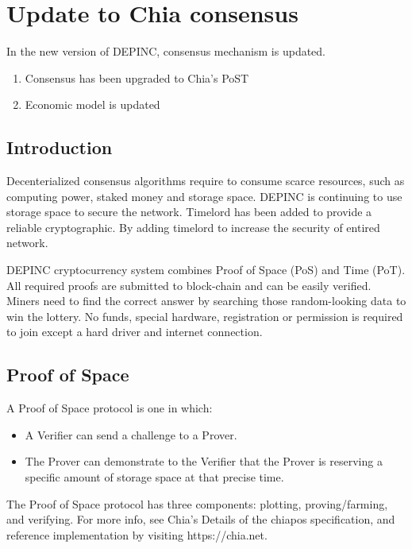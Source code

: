 \chapter{Update to Chia consensus}
\begin{flushleft}
    In the new version of DEPINC, consensus mechanism is updated.
    \begin{enumerate}
        \item Consensus has been upgraded to Chia's PoST
        \item Economic model is updated
    \end{enumerate}
\end{flushleft}
\section{Introduction}
\begin{flushleft}
    Decenterialized consensus algorithms require to consume scarce resources, such as computing power, staked money and storage space. DEPINC is continuing to use storage space to secure the network. Timelord has been added to provide a reliable cryptographic. By adding timelord to increase the security of entired network.
\end{flushleft}
\begin{flushleft}
    DEPINC cryptocurrency system combines Proof of Space (PoS) and Time (PoT). All required proofs are submitted to block-chain and can be easily verified. Miners need to find the correct answer by searching those random-looking data to win the lottery. No funds, special hardware, registration or permission is required to join except a hard driver and internet connection.
\end{flushleft}
\section{Proof of Space}
\begin{flushleft}
    A Proof of Space protocol is one in which:
\end{flushleft}
\begin{itemize}
    \item A Verifier can send a challenge to a Prover.
    \item The Prover can demonstrate to the Verifier that the Prover is reserving a specific amount of storage space at that precise time.
\end{itemize}
\begin{flushleft}
    The Proof of Space protocol has three components: plotting, proving/farming, and verifying. For more info, see Chia's Details of the chiapos specification, and reference implementation by visiting https://chia.net.
\end{flushleft}

